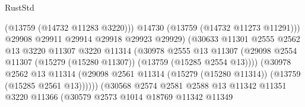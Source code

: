 \begin{lexlean}{RustStd}
\begin{coremodule}
                                              (@13759 (@14732 @11283 @3220)))
                                            @14730
                                            (@13759 (@14732 @11273 @11291)))
                                          @29908
                                          @29911
                                          @29914
                                          @29918
                                          @29923
                                          @29929)
                                        (@30633
                                          @11301
                                          @2555
                                          @2562
                                          @13
                                          @3220
                                          @11307
                                          @3220
                                          @11314
                                          (@30978
                                            @2555
                                            @13
                                            @11307
                                            (@29098
                                              @2554
                                              @11307
                                              (@15279 (@15280 @11307))
                                              (@13759 (@15285 @2554 @13))))
                                          (@30978
                                            @2562
                                            @13
                                            @11314
                                            (@29098
                                              @2561
                                              @11314
                                              (@15279 (@15280 @11314))
                                              (@13759 (@15285 @2561 @13))))))
                                      (@30568
                                        @2574
                                        @2581
                                        @2588
                                        @13
                                        @11342
                                        @11351
                                        @3220
                                        @11366
                                        (@30579
                                          @2573
                                          @1014
                                          @18769
                                          @11342
                                          @11349

\end{coremodule}
\end{lexlean}
